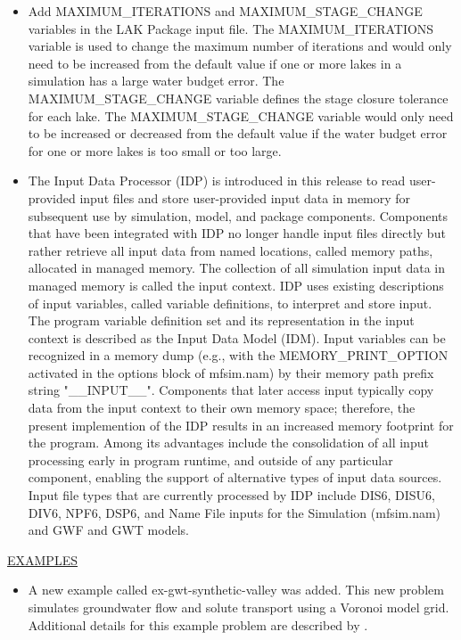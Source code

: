 \begin{itemize}
		\item Add MAXIMUM\_ITERATIONS and MAXIMUM\_STAGE\_CHANGE variables in the LAK Package input file. The MAXIMUM\_ITERATIONS variable is used to change the maximum number of iterations and would only need to be increased from the default value if one or more lakes in a simulation has a large water budget error.  The MAXIMUM\_STAGE\_CHANGE variable defines the stage closure tolerance for each lake. The MAXIMUM\_STAGE\_CHANGE variable would only need to be increased or decreased from the default value if the water budget error for one or more lakes is too small or too large. 
		\item The Input Data Processor (IDP) is introduced in this release to read user-provided input files and store user-provided input data in memory for subsequent use by simulation, model, and package components.  Components that have been integrated with IDP no longer handle input files directly but rather retrieve all input data from named locations, called memory paths, allocated in managed memory.  The collection of all simulation input data in managed memory is called the input context.  IDP uses existing descriptions of input variables, called variable definitions, to interpret and store input.  The program variable definition set and its representation in the input context is described as the Input Data Model (IDM).  Input variables can be recognized in a memory dump (e.g., with the MEMORY\_PRINT\_OPTION activated in the options block of mfsim.nam) by their memory path prefix string "\_\_INPUT\_\_".  Components that later access input typically copy data from the input context to their own memory space; therefore, the present implemention of the IDP results in an increased memory footprint for the program.  Among its advantages include the consolidation of all input processing early in program runtime, and outside of any particular component, enabling the support of alternative types of input data sources.  Input file types that are currently processed by IDP include DIS6, DISU6, DIV6, NPF6, DSP6, and Name File inputs for the Simulation (mfsim.nam) and GWF and GWT models.
	\end{itemize}

	\underline{EXAMPLES}
	\begin{itemize}
		\item A new example called ex-gwt-synthetic-valley was added.  This new problem simulates groundwater flow and solute transport using a Voronoi model grid.  Additional details for this example problem are described by \cite{hughes2023flopy}.
	\end{itemize}

